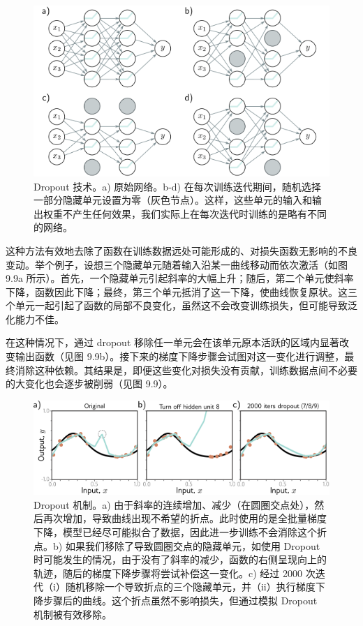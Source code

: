 \begin{figure}[ht!]
	\centering
	\includegraphics[width=0.7\linewidth]{png/chapter9/RegDropoutNetwork.png}
	\caption{Dropout 技术。a) 原始网络。b-d) 在每次训练迭代期间，随机选择一部分隐藏单元设置为零（灰色节点）。这样，这些单元的输入和输出权重不产生任何效果，我们实际上在每次迭代时训练的是略有不同的网络。}
\end{figure}


这种方法有效地去除了函数在训练数据远处可能形成的、对损失函数无影响的不良变动。举个例子，设想三个隐藏单元随着输入沿某一曲线移动而依次激活（如图 9.9a 所示）。首先，一个隐藏单元引起斜率的大幅上升；随后，第二个单元使斜率下降，函数因此下降；最终，第三个单元抵消了这一下降，使曲线恢复原状。这三个单元一起引起了函数的局部不良变化，虽然这不会改变训练损失，但可能导致泛化能力不佳。

在这种情况下，通过 dropout 移除任一单元会在该单元原本活跃的区域内显著改变输出函数（见图 9.9b）。接下来的梯度下降步骤会试图对这一变化进行调整，最终消除这种依赖。其结果是，即便这些变化对损失没有贡献，训练数据点间不必要的大变化也会逐步被削弱（见图 9.9）。

\begin{figure}[ht!]
	\centering
	\includegraphics[width=0.7\linewidth]{png/chapter9/RegDropout.png}
	\caption{Dropout 机制。a) 由于斜率的连续增加、减少（在圆圈交点处），然后再次增加，导致曲线出现不希望的折点。此时使用的是全批量梯度下降，模型已经尽可能拟合了数据，因此进一步训练不会消除这个折点。b) 如果我们移除了导致圆圈交点的隐藏单元，如使用 Dropout 时可能发生的情况，由于没有了斜率的减少，函数的右侧呈现向上的轨迹，随后的梯度下降步骤将尝试补偿这一变化。c) 经过 2000 次迭代（i）随机移除一个导致折点的三个隐藏单元，并（ii）执行梯度下降步骤后的曲线。这个折点虽然不影响损失，但通过模拟 Dropout 机制被有效移除。}
\end{figure}


